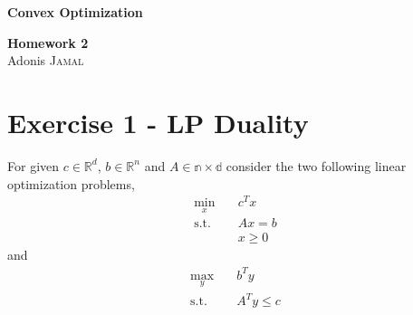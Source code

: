 \documentclass[11pt,a4paper]{article}
\begin{document}
\begin{titlepage}
\begin{center}
{\huge \bfseries Convex Optimization \\
[0.4cm] }

{\large \bfseries Homework 2\\[0.4cm] }
{\Large Adonis \textsc{Jamal}}

\vspace{3cm}

\tableofcontents
\end{center}
\end{titlepage}

\renewcommand{\arraystretch}{1.5}
\newpage


\section{Exercise 1 - LP Duality}
For given $c \in \mathbb{R}^d$, $b \in \mathbb{R}^n$ and $A \in \mathbb{n \times d}$ consider the two following linear optimization problems,
\begin{equation} \tag{P}
    \begin{aligned}
        \min_{x} \quad & c^{T}x \\
        \text{s.t.} \quad & Ax = b \\
        & x \ge 0
    \end{aligned}
\end{equation}
and
\begin{equation} \tag{D}
    \begin{aligned}
        \max_{y} \quad & b^{T}y \\
        \text{s.t.} \quad & A^{T}y \le c
    \end{aligned}
\end{equation}
\end{document}
